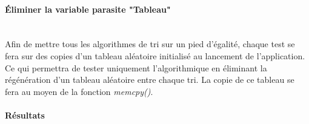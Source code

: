 \documentclass[11pt]{article}
\begin{document}
\paragraph{Éliminer la variable parasite "Tableau"}~\\
Afin de mettre tous les algorithmes de tri sur un pied d'égalité, chaque test se fera sur des copies d'un tableau aléatoire initialisé au lancement de l'application. Ce qui permettra de tester uniquement l'algorithmique en éliminant la régénération d'un tableau aléatoire entre chaque tri. La copie de ce tableau se fera au moyen de la fonction \textit{memcpy()}.

\paragraph{Résultats}~\\
\end{document}
